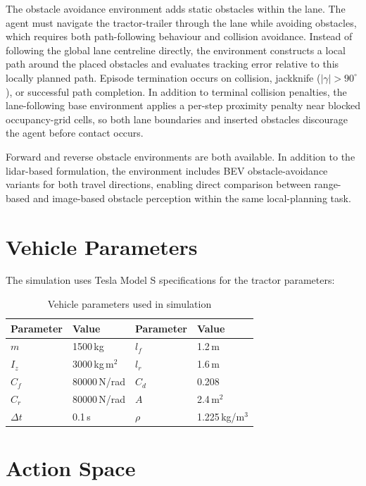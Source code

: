 The obstacle avoidance environment adds static obstacles within the lane. The agent must navigate the tractor-trailer through the lane while avoiding obstacles, which requires both path-following behaviour and collision avoidance. Instead of following the global lane centreline directly, the environment constructs a local path around the placed obstacles and evaluates tracking error relative to this locally planned path. Episode termination occurs on collision, jackknife ($|\gamma| > 90^\circ$), or successful path completion. In addition to terminal collision penalties, the lane-following base environment applies a per-step proximity penalty near blocked occupancy-grid cells, so both lane boundaries and inserted obstacles discourage the agent before contact occurs.

Forward and reverse obstacle environments are both available. In addition to the lidar-based formulation, the environment includes BEV obstacle-avoidance variants for both travel directions, enabling direct comparison between range-based and image-based obstacle perception within the same local-planning task.

\section{Vehicle Parameters}

The simulation uses Tesla Model S specifications for the tractor parameters:

\begin{table}[H]
\centering
\caption{Vehicle parameters used in simulation}
\label{tab:vehicle_params}
\begin{tabular}{llll}
\toprule
Parameter & Value & Parameter & Value \\
\midrule
$m$ & 1500\,kg & $l_f$ & 1.2\,m \\
$I_z$ & 3000\,kg\,m$^2$ & $l_r$ & 1.6\,m \\
$C_f$ & 80000\,N/rad & $C_d$ & 0.208 \\
$C_r$ & 80000\,N/rad & $A$ & 2.4\,m$^2$ \\
$\Delta t$ & 0.1\,s & $\rho$ & 1.225\,kg/m$^3$ \\
\bottomrule
\end{tabular}
\end{table}

\section{Action Space}


